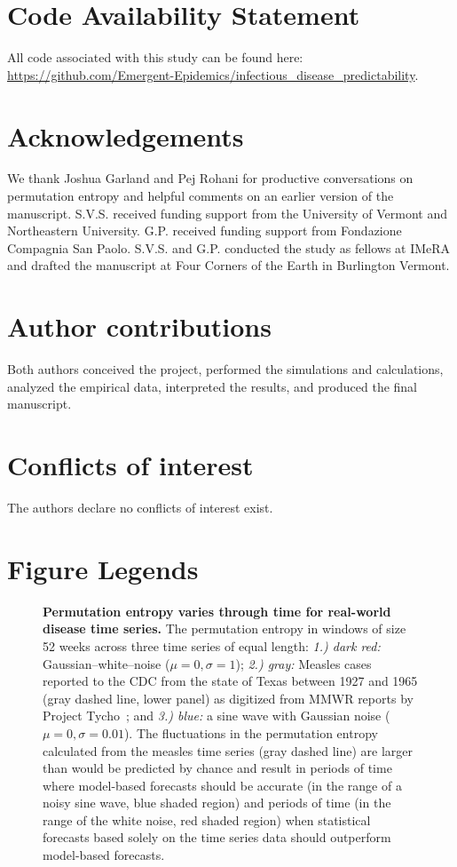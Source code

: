 \documentclass[fleqn,12pt]{wlscirep}
\begin{document}
\section*{Code Availability Statement}
All code associated with this study can be found here: \url{https://github.com/Emergent-Epidemics/infectious_disease_predictability}.

\section*{Acknowledgements}
We thank Joshua Garland and Pej Rohani for productive conversations on permutation entropy and helpful comments on an earlier version of the manuscript. S.V.S. received funding support from the University of Vermont and Northeastern University. G.P. received funding support from Fondazione Compagnia San Paolo. S.V.S. and G.P. conducted the study as fellows at IMeRA and drafted the manuscript at Four Corners of the Earth in Burlington Vermont.

\section*{Author contributions}
Both authors conceived the project, performed the simulations and calculations, analyzed the empirical data, interpreted the results, and produced the final manuscript.

\section*{Conflicts of interest}
The authors declare no conflicts of interest exist.

\newpage

\section*{Figure Legends}
\begin{figure}[H]
	\centering
	\caption{\label{fig:timeserie}\textbf{Permutation entropy varies through time for real-world disease time series.} The permutation entropy in windows of size 52 weeks across three time series of equal length: \textit{1.) dark red:} Gaussian--white--noise ($\mu = 0, \sigma = 1$); \textit{2.) gray:} Measles cases reported to the CDC from the state of Texas between 1927 and 1965 (gray dashed line, lower panel) as digitized from MMWR reports by Project Tycho~\cite{tycho}; and \textit{3.) blue:} a sine wave with Gaussian noise ($\mu = 0, \sigma = 0.01$).  The fluctuations in the permutation entropy calculated from the measles time series (gray dashed line) are larger than would be predicted by chance and result in periods of time where model-based forecasts should be accurate (in the range of a noisy sine wave, blue shaded region) and periods of time (in the range of the white noise, red shaded region) when statistical forecasts based solely on the time series data should outperform model-based forecasts.}
\end{figure}
\end{document}
